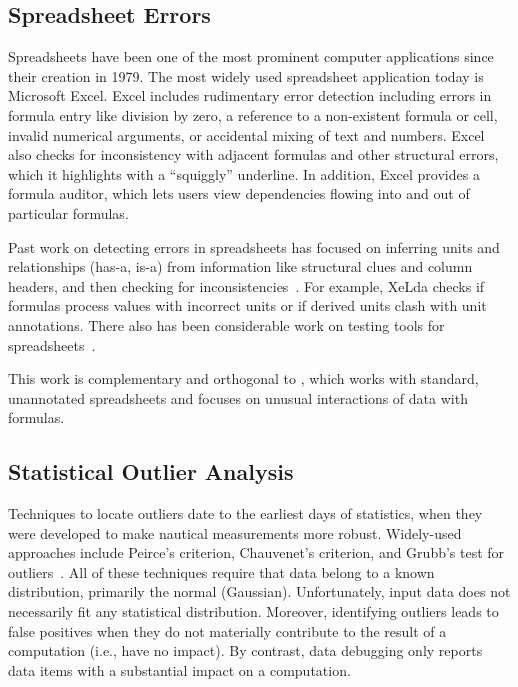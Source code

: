 \subsection*{Spreadsheet Errors}

Spreadsheets have been one of the most prominent computer applications
since their creation in 1979.
 The most widely used spreadsheet application today is Microsoft
Excel. Excel includes rudimentary error detection including errors in
formula entry like division by zero, a reference to a non-existent
formula or cell, invalid numerical arguments, or accidental mixing of
text and numbers.
Excel also checks for inconsistency with adjacent formulas and other
structural errors, which it highlights with a ``squiggly'' underline. In addition, Excel provides a formula auditor, which lets users view dependencies flowing into and out of particular formulas.

Past work on detecting errors in spreadsheets has focused on inferring
units and relationships (has-a, is-a) from information like structural
clues and column
headers, and then checking for inconsistencies~\cite{Antoniu:2004:VUC:998675.999448,DBLP:conf/kbse/AhmadAGK03,Chambers:2010:RSL:1860134.1860346,Erwig:2009:SES:1608570.1608694,Erwig:2005:AGM:1062455.1062494}. For
example, XeLda checks if formulas process values with incorrect units
or if derived units clash with unit annotations. There also has been
considerable work on testing tools for
spreadsheets~\cite{fisher2006scaling,rothermel1998you,rothermel2001methodology,Carver:2006:EET:1159733.1159775}.

This work is complementary and orthogonal to \checkcell{}, which
works with standard, unannotated spreadsheets and focuses on unusual
interactions of data with formulas.



\subsection*{Statistical Outlier Analysis}

Techniques to locate outliers date to the earliest days of statistics,
when they were developed to make nautical measurements more
robust. Widely-used approaches include Peirce's criterion, Chauvenet's
criterion, and Grubb's test for
outliers~\cite{barnett1994outliers}. All of these techniques require
that data belong to a known distribution, primarily the normal
(Gaussian). Unfortunately, input data does not necessarily fit any
statistical distribution. Moreover, identifying outliers leads to
false positives when they do not materially contribute to the result
of a computation (i.e., have no impact). By contrast, data debugging only reports
data items with a substantial impact on a computation.


